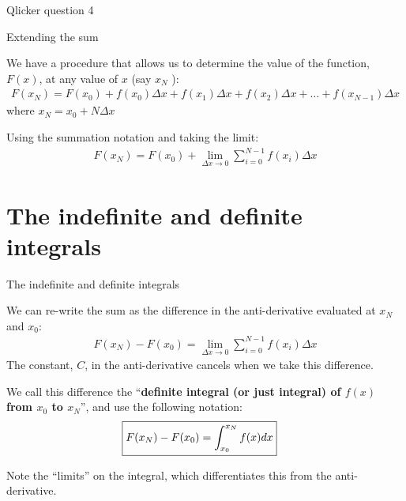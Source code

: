 \documentclass[aspectratio=169,
hyperref={colorlinks,urlcolor=blue}
]{beamer}
\begin{document}
\begin{frame}{Qlicker question 4}

\end{frame}


\begin{bulletframe}{Extending the sum}
\item We have a procedure that allows us to determine the value of the function, $F(x)$, at any value of $x$ (say $x_N$ ):
\begin{align*}
F(x_N) = F(x_0)+f(x_0)\Delta x + f(x_1)\Delta x+ f(x_2)\Delta x+\dots + f(x_{N-1})\Delta x
\end{align*}
where $x_N=x_0+N\Delta x$
\item Using the summation notation and taking the limit:
\begin{align*}
F(x_N) = F(x_0)+\lim_{\Delta x \to 0}\sum_{i=0}^{N-1}f(x_i)\Delta x
\end{align*}
\end{bulletframe}


\section{The indefinite and definite integrals}
\label{sec:indefanddefintegrals}
\begin{bulletframe}{The indefinite and definite integrals}
\item We can re-write the sum as the difference in the anti-derivative evaluated at $x_N$ and $x_0$:
\begin{align*}
F(x_N) - F(x_0)=\lim_{\Delta x \to 0}\sum_{i=0}^{N-1}f(x_i)\Delta x
\end{align*}
The constant, $C$, in the anti-derivative cancels when we take this difference.
\item We call this difference the ``\textbf{definite integral (or just integral) of $f(x)$ from $x_0$  to $x_N$}'', and use the following notation:
\begin{align*}
\Aboxed{F(x_N) - F(x_0)=\int_{x_0}^{x_N}f(x)dx}
\end{align*}
\item Note the ``limits'' on the integral, which differentiates this from the anti-derivative.
\end{bulletframe}
\end{document}
